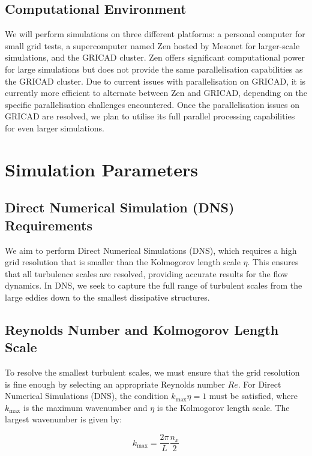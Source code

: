 \documentclass[final,5p,times,twocolumn,authoryear]{elsarticle}
\begin{document}
\subsection{Computational Environment}
We will perform simulations on three different platforms: a personal computer for small grid tests, a supercomputer named Zen hosted by Mesonet for larger-scale simulations, and the GRICAD cluster. Zen offers significant computational power for large simulations but does not provide the same parallelisation capabilities as the GRICAD cluster. Due to current issues with parallelisation on GRICAD, it is currently more efficient to alternate between Zen and GRICAD, depending on the specific parallelisation challenges encountered. Once the parallelisation issues on GRICAD are resolved, we plan to utilise its full parallel processing capabilities for even larger simulations.

\section{Simulation Parameters}
\subsection{Direct Numerical Simulation (DNS) Requirements}

We aim to perform Direct Numerical Simulations (DNS), which requires a high grid resolution that is smaller than the Kolmogorov length scale $\eta$. This ensures that all turbulence scales are resolved, providing accurate results for the flow dynamics. In DNS, we seek to capture the full range of turbulent scales from the large eddies down to the smallest dissipative structures.

\subsection{Reynolds Number and Kolmogorov Length Scale}

To resolve the smallest turbulent scales, we must ensure that the grid resolution is fine enough by selecting an appropriate Reynolds number $Re$. For Direct Numerical Simulations (DNS), the condition $k_{\text{max}} \eta = 1$ must be satisfied, where $k_{\text{max}}$ is the maximum wavenumber and $\eta$ is the Kolmogorov length scale. The largest wavenumber is given by:

\begin{equation*}
k_{\text{max}} = \frac{2\pi}{L} \frac{n_x}{2}
\end{equation*}
\end{document}
